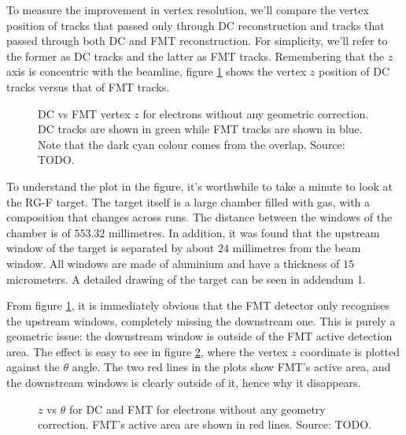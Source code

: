     To measure the improvement in vertex resolution, we'll compare the vertex position of tracks that passed only through DC reconstruction and tracks that passed through both DC and FMT reconstruction.
    For simplicity, we'll refer to the former as DC tracks and the latter as FMT tracks.
    Remembering that the $z$ axis is concentric with the beamline, figure \ref{fig::dc_vs_fmt_vz_011983} shows the vertex $z$ position of DC tracks versus that of FMT tracks.

    \begin{figure}[h!]
        \centering{}
        \caption[DC vs FMT $z$ without geometric correction]{DC vs FMT vertex $z$ for electrons without any geometric correction. DC tracks are shown in green while FMT tracks are shown in blue. Note that the dark cyan colour comes from the overlap.
        Source: TODO.}
        \label{fig::dc_vs_fmt_vz_011983}
    \end{figure}

    To understand the plot in the figure, it's worthwhile to take a minute to look at the RG-F target.
    The target itself is a large chamber filled with gas, with a composition that changes across runs.
    The distance between the windows of the chamber is of $553.32$ millimetres.
    In addition, it was found that the upstream window of the target is separated by about $24$ millimetres from the beam window.
    All windows are made of aluminium and have a thickness of $15$ micrometers. %
    A detailed drawing of the target can be seen in addendum 1.

    From figure \ref{fig::dc_vs_fmt_vz_011983}, it is immediately obvious that the FMT detector only recognises the upstream windows, completely missing the downstream one.
    This is purely a geometric issue:
    the downstream window is outside of the FMT active detection area.
    The effect is easy to see in figure \ref{fig::vz_vs_theta}, where the vertex $z$ coordinate is plotted against the $\theta$ angle.
    The two red lines in the plots show FMT's active area, and the downstream windows is clearly outside of it, hence why it disappears.

    \begin{figure}[t!]
        \centering{}
        \caption[$z$ vs $\theta$ for DC and FMT.]{$z$ vs $\theta$ for DC and FMT for electrons without any geometry correction. FMT's active area are shown in red lines.
        Source: TODO.}
        \label{fig::vz_vs_theta}
    \end{figure}

